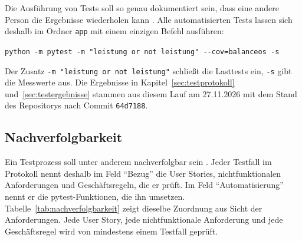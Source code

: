 Die Ausführung von Tests soll so genau dokumentiert sein, dass eine andere Person die Ergebnisse wiederholen kann \parencite[S.~5-21]{swebok2026}. Alle automatisierten Tests lassen sich deshalb im Ordner \texttt{app} mit einem einzigen Befehl ausführen:

\verb|python -m pytest -m "leistung or not leistung" --cov=balanceos -s|

Der Zusatz \verb|-m "leistung or not leistung"| schließt die Lasttests ein, \texttt{-s} gibt die Messwerte aus. Die Ergebnisse in Kapitel~\ref{sec:testprotokoll} und~\ref{sec:testergebnisse} stammen aus diesem Lauf am 27.11.2026 mit dem Stand des Repositorys nach Commit \texttt{64d7188}.

\subsection{Nachverfolgbarkeit}\label{sec:nachverfolgbarkeit}
Ein Testprozess soll unter anderem nachverfolgbar sein \parencite[S.~5-18]{swebok2026}. Jeder Testfall im Protokoll nennt deshalb im Feld \enquote{Bezug} die User Stories, nichtfunktionalen Anforderungen und Geschäftsregeln, die er prüft. Im Feld \enquote{Automatisierung} nennt er die pytest-Funktionen, die ihn umsetzen. Tabelle~\ref{tab:nachverfolgbarkeit} zeigt dieselbe Zuordnung aus Sicht der Anforderungen. Jede User Story, jede nichtfunktionale Anforderung und jede Geschäftsregel wird von mindestens einem Testfall geprüft.

